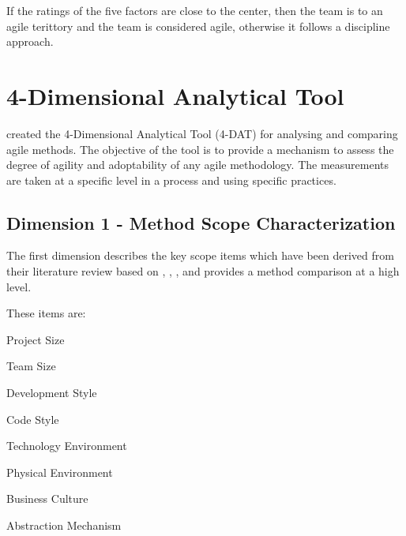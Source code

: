 

If the ratings of the five factors are close to the center, then the team is to an agile terittory and the team  is considered agile, otherwise it follows a discipline approach.





\section{4-Dimensional Analytical Tool} %
\citet{qumer2006measuring} created the 4-Dimensional Analytical Tool (4-DAT) for analysing and comparing agile methods. The objective of the tool is to provide a mechanism to assess the degree of agility and adoptability of any agile methodology. The measurements are taken at a specific level in a process and using specific practices.

\subsection{Dimension 1 - Method Scope Characterization}
The first dimension describes the key scope items which have been derived from their literature review based on \citet{Beck:2004:EPE:1076267}, \citet{koch2005agile}, \citet{Palmer:2001:PGF:600044}, \citet{Highsmith:2000:ASD:323922} and provides a method comparison at a high level. 

These items are:
\begin{inparaenum} [a\upshape)]
\item Project Size
\item Team Size
\item Development Style
\item Code Style
\item Technology Environment
\item Physical Environment
\item Business Culture
\item Abstraction Mechanism
\end{inparaenum}


